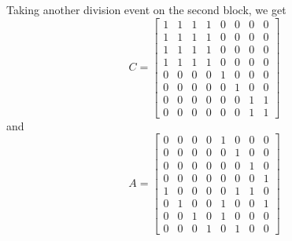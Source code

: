 Taking another division event on the second block, we get
\begin{equation*}
    C = 
    \begin{bmatrix}
    1 & 1 & 1 & 1 & 0 & 0 & 0 & 0 \\
    1 & 1 & 1 & 1 & 0 & 0 & 0 & 0 \\
    1 & 1 & 1 & 1 & 0 & 0 & 0 & 0 \\
    1 & 1 & 1 & 1 & 0 & 0 & 0 & 0 \\
    0 & 0 & 0 & 0 & 1 & 0 & 0 & 0 \\
    0 & 0 & 0 & 0 & 0 & 1 & 0 & 0 \\
    0 & 0 & 0 & 0 & 0 & 0 & 1 & 1 \\
    0 & 0 & 0 & 0 & 0 & 0 & 1 & 1 
    \end{bmatrix}
\end{equation*}
and 
\begin{equation*}
    A = 
    \begin{bmatrix}
    0 & 0 & 0 & 0 & 1 & 0 & 0 & 0 \\
    0 & 0 & 0 & 0 & 0 & 1 & 0 & 0 \\
    0 & 0 & 0 & 0 & 0 & 0 & 1 & 0 \\
    0 & 0 & 0 & 0 & 0 & 0 & 0 & 1 \\
    1 & 0 & 0 & 0 & 0 & 1 & 1 & 0 \\
    0 & 1 & 0 & 0 & 1 & 0 & 0 & 1 \\
    0 & 0 & 1 & 0 & 1 & 0 & 0 & 0 \\
    0 & 0 & 0 & 1 & 0 & 1 & 0 & 0 
    \end{bmatrix}
\end{equation*}

\newpage


